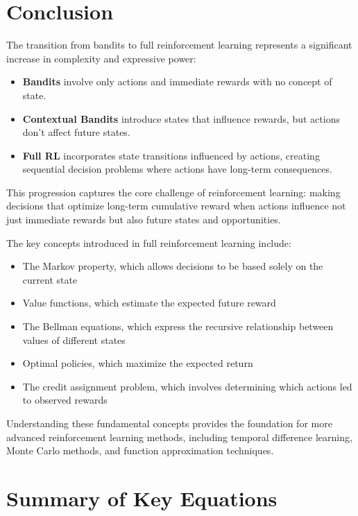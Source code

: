 \documentclass[12pt,a4paper]{article}
\begin{document}
\section{Conclusion}

The transition from bandits to full reinforcement learning represents a significant increase in complexity and expressive power:

\begin{itemize}
    \item \textbf{Bandits} involve only actions and immediate rewards with no concept of state.
    \item \textbf{Contextual Bandits} introduce states that influence rewards, but actions don't affect future states.
    \item \textbf{Full RL} incorporates state transitions influenced by actions, creating sequential decision problems where actions have long-term consequences.
\end{itemize}

This progression captures the core challenge of reinforcement learning: making decisions that optimize long-term cumulative reward when actions influence not just immediate rewards but also future states and opportunities.

The key concepts introduced in full reinforcement learning include:
\begin{itemize}
    \item The Markov property, which allows decisions to be based solely on the current state
    \item Value functions, which estimate the expected future reward
    \item The Bellman equations, which express the recursive relationship between values of different states
    \item Optimal policies, which maximize the expected return
    \item The credit assignment problem, which involves determining which actions led to observed rewards
\end{itemize}

Understanding these fundamental concepts provides the foundation for more advanced reinforcement learning methods, including temporal difference learning, Monte Carlo methods, and function approximation techniques.

\section{Summary of Key Equations}
\end{document}
